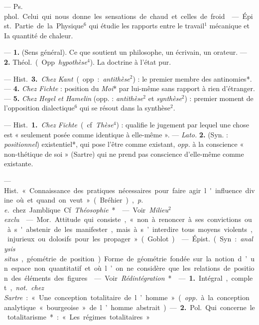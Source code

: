 \begin{itemize}[leftmargin=1cm, label=, itemsep=1pt]
 — \si{Ps. phol.} Celui qui nous donne les sensations de
chaud et celles de froid.

 — \si{Épist.} Partie de la Physique$^6$ qui étudie les
rapports entre le travail$^1$ mécanique et Ia quantité de chaleur.

 — {\bf 1.} (Sens général). Ce que soutient un philosophe, un
écrivain, un orateur. — {\bf 2.} \si{Théol.} (Opp. {\it hypothèse}$^4$). La
doctrine à l'état pur.

— \si{Hist.} {\bf 3.} {\it Chez Kant} (opp. : {\it antithèse}$^2$) : le
premier membre des antinomies*. — {\bf 4.} {\it Chez Fichte} : position du
{\it Moi}* par lui-même sans rapport à rien d’étranger. — {\bf 5.} {\it Chez
Hegel et Hamelin} (opp. : {\it antithèse}$^2$ et {\it synthèse}$^2$) :
premier moment de l'opposition dialectique$^6$ qui se résout dans la
synthèse$^2$.

 — \si{Hist.} {\bf 1.} {\it Chez Fichte} (cf. {\it Thèse}$^4$) :
qualifie le jugement par lequel une chose est « seulement posée comme
identique à elle-même ». — {\it Lato.} {\bf 2.} (Syn. : {\it positionnel})
existentiel*, qui pose l'être comme existant, {\it opp.} à la conscience «
non-thétique de soi » (Sartre) qui ne prend pas conscience d’elle-même comme
existante.

 — \si{Hist.} « Connaissance des pratiques nécessaires pour
faire agir l'influence divine où et quand on veut » (Bréhier), {\it p. e.}
chez Jamblique. Cf. {\it Théosophie}*.

 — Voir {\it Milieu$^2$ exclu}.

 — \si{Mor.} Attitude qui consiste, « non à renoncer à ses
convictions ou à s'abstenir de les manifester, mais à s’interdire tous moyens
violents, injurieux ou dolosifs pour les propager » (Goblot).

 — \si{Épist.} (Syn. : {\it analysis situs}, géométrie de
position). Forme de géométrie fondée sur la notion d’un espace non
quantitatif et où l’on ne considère que les relations de position des
éléments des figures.

 — Voir {\it Rédintégration}*.

 — {\bf 1.} Intégral, complet, {\it not.} {\it chez Sartre} :
« Une conception totalitaire de l’homme » ({\it opp.} à la conception
analytique « bourgeoise » de l’homme abstrait). — {\bf 2.} \si{Pol.} Qui
concerne le totalitarisme* : « Les régimes totalitaires. »


\end{itemize}
